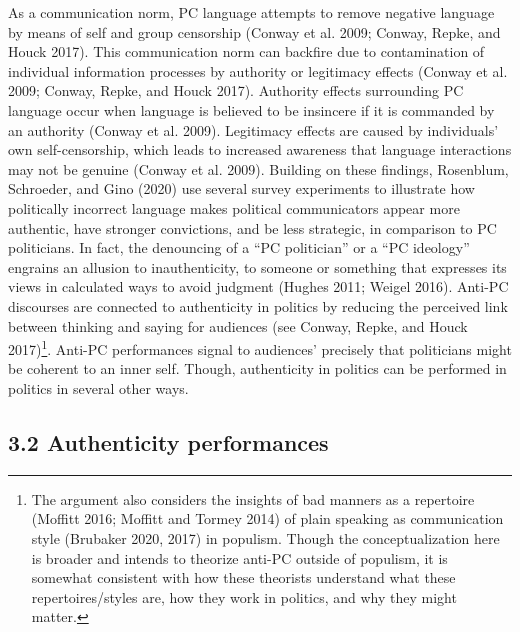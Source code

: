 \documentclass[
  12pt,
]{article}
\begin{document}
As a communication norm, PC language attempts to remove negative
language by means of self and group censorship (Conway et al. 2009;
Conway, Repke, and Houck 2017). This communication norm can backfire due
to contamination of individual information processes by authority or
legitimacy effects (Conway et al. 2009; Conway, Repke, and Houck 2017).
Authority effects surrounding PC language occur when language is
believed to be insincere if it is commanded by an authority (Conway et
al. 2009). Legitimacy effects are caused by individuals' own
self-censorship, which leads to increased awareness that language
interactions may not be genuine (Conway et al. 2009). Building on these
findings, Rosenblum, Schroeder, and Gino (2020) use several survey
experiments to illustrate how politically incorrect language makes
political communicators appear more authentic, have stronger
convictions, and be less strategic, in comparison to PC politicians. In
fact, the denouncing of a ``PC politician'' or a ``PC ideology''
engrains an allusion to inauthenticity, to someone or something that
expresses its views in calculated ways to avoid judgment (Hughes 2011;
Weigel 2016). Anti-PC discourses are connected to authenticity in
politics by reducing the perceived link between thinking and saying for
audiences (see Conway, Repke, and Houck 2017)\footnote{ The argument
  also considers the insights of bad manners as a repertoire (Moffitt
  2016; Moffitt and Tormey 2014) of plain speaking as communication
  style (Brubaker 2020, 2017) in populism. Though the conceptualization
  here is broader and intends to theorize anti-PC outside of populism,
  it is somewhat consistent with how these theorists understand what
  these repertoires/styles are, how they work in politics, and why they
  might matter.}. Anti-PC performances signal to audiences' precisely
that politicians might be coherent to an inner self. Though,
authenticity in politics can be performed in politics in several other
ways.

\hypertarget{authenticity-performances}{%
\subsection{3.2 Authenticity
performances}\label{authenticity-performances}}
\end{document}
